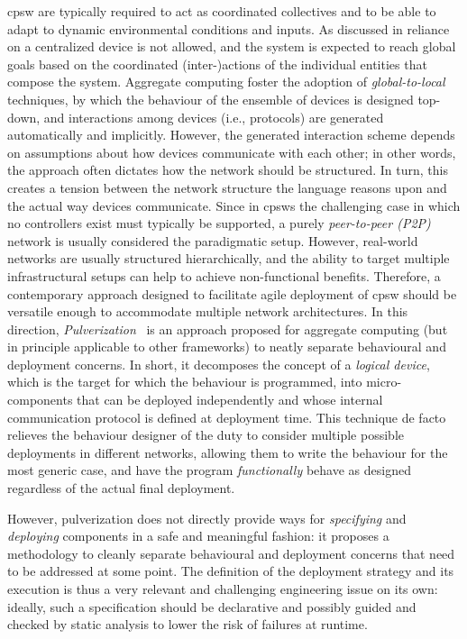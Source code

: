 \minitoc%
%
\newcommand{\scalaloci}{{ScalaLoci}}
\newcommand{\scafiloci}{{ScaFiLoci}}
\newcommand{\scalainline}[1]{\lstinline{#1}}
\ac{cpsw} are typically required 
 to act as coordinated collectives
 and to be able to adapt to dynamic
 environmental conditions and inputs.
%
%
As discussed in  reliance on a centralized device is not allowed,
and the system is expected to reach global goals based 
 on the coordinated (inter-)actions of the individual entities that compose the system.
Aggregate computing foster the adoption of \emph{global-to-local} techniques,
by which the behaviour of the ensemble of devices is designed top-down,
and interactions among devices (i.e., protocols) are generated automatically and implicitly.
%
However, the generated interaction scheme depends on assumptions about how devices communicate with each other;
in other words, the approach often dictates how the network should be structured.
%
In turn, this creates a tension between the network structure the language reasons upon and the actual way devices communicate.
%
Since in \acp{cpsw} the challenging case in which no controllers exist must typically be supported, 
 a purely \emph{peer-to-peer (P2P)} network is usually considered the paradigmatic setup.
%
However, real-world networks are usually structured hierarchically, 
 and the ability to target multiple infrastructural setups can help to achieve non-functional benefits.
%
Therefore, a contemporary approach designed to facilitate agile deployment of \ac{cpsw} should be versatile enough to accommodate multiple network architectures.
In this direction, \emph{Pulverization}~\cite{DBLP:journals/fi/CasadeiPPVW20}
 is an approach proposed for aggregate computing 
 (but in principle applicable to other frameworks) 
 to neatly separate behavioural and deployment concerns.
%
In short, it decomposes the concept of a \emph{logical device}, 
 which is the target for which the behaviour is programmed,
 into micro-components that can be deployed independently
 and whose internal communication protocol is defined at deployment time.
%
This technique de facto relieves the behaviour designer of the duty 
 to consider multiple possible  deployments in different networks, 
 allowing them to write the behaviour for the most generic case, 
 and have the program \emph{functionally} behave as designed regardless of the actual final deployment.

However, pulverization does not directly provide ways for \emph{specifying} and \emph{deploying} components in a safe and meaningful fashion:
 it proposes a methodology to cleanly separate behavioural and deployment concerns that need to be addressed at some point.
%
The definition of the deployment strategy and its execution is thus a very relevant and challenging engineering issue on its own:
 ideally, such a specification should be declarative
 and possibly guided and checked by static analysis
 to lower the risk of failures at runtime.

